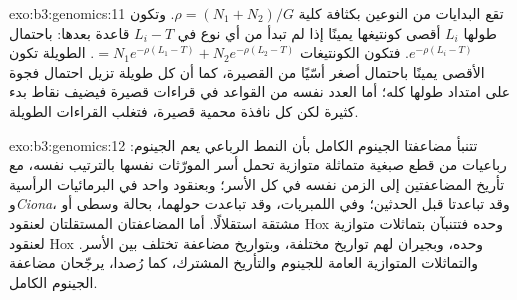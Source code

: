 \begin{solution}{exo:b3:genomics:11}
تقع البدايات من النوعين بكثافة كلية $\rho = (N_{1} +
N_{2})/G$. وتكون  طولها $L_{i}$ أقصى كونتيغها يمينًا إذا لم
تبدأ  من أي نوع في $L_{i} - T$ قاعدة بعدها:
باحتمال $e^{-\rho(L_{i} - T)}$. فتكون الكونتيغات $= N_{1}
e^{-\rho(L_{1} - T)} + N_{2} e^{-\rho(L_{2} - T)}$.  الطويلة
تكون الأقصى يمينًا باحتمال أصغر أسّيًا من  القصيرة،
كما أن كل  طويلة تزيل احتمال فجوة على امتداد طولها
كله؛ أما العدد نفسه من القواعد في قراءات قصيرة فيضيف نقاط بدء
كثيرة لكن كل نافذة محمية قصيرة، فتغلب القراءات الطويلة.
\end{solution}

\begin{solution}{exo:b3:genomics:12}
تتنبأ مضاعفتا الجينوم الكامل بأن النمط الرباعي يعم
الجينوم: رباعيات من قطع صبغية متماثلة متوازية
تحمل أسر المورّثات نفسها بالترتيب نفسه، مع تأريخ
المضاعفتين إلى الزمن نفسه في كل الأسر؛ وبعنقود واحد
في البرمائيات الرأسية و\emph{Ciona}، وقد تباعدتا قبل الحدثين؛ وفي
اللمبريات، وقد تباعدت حولهما، بحالة وسطى أو
مشتقة استقلالًا. أما المضاعفتان المستقلتان لعنقود Hox
وحده فتتنبآن بتماثلات متوازية لعنقود Hox وحده، وبجيران لهم
تواريخ مختلفة، وبتواريخ مضاعفة تختلف بين
الأسر. والتماثلات المتوازية العامة للجينوم والتأريخ المشترك، كما
رُصدا، يرجّحان مضاعفة الجينوم الكامل.
\end{solution}

